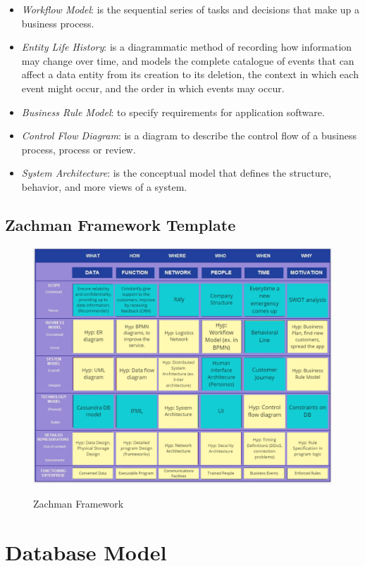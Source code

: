 \documentclass[../main.tex]{subfiles}
\begin{document}
\begin{itemize}
        \item \textit{Workflow Model}: is the sequential series of tasks and decisions that make up a business process.
        \item \textit{Entity Life History}: is a diagrammatic method of recording how information may change over time, and models the complete catalogue of events that can affect a data entity from its creation to its deletion, the context in which each event might occur, and the order in which events may occur.
        \item \textit{Business Rule Model}: to specify requirements for application software.
        \item \textit{Control Flow Diagram}: is a diagram to describe the control flow of a business process, process or review.
        \item \textit{System Architecture}: is the conceptual model that defines the structure, behavior, and more views of a system.
    \end{itemize}
    \subsection{Zachman Framework Template}
    \begin{figure}[H]
        \centering
        \includegraphics[scale = 0.65]{assets/zachman.png} \\
        \caption[]{Zachman Framework}\label{fig:figure12}
    \end{figure}
    \newpage
    \section{Database Model}
\end{document}
